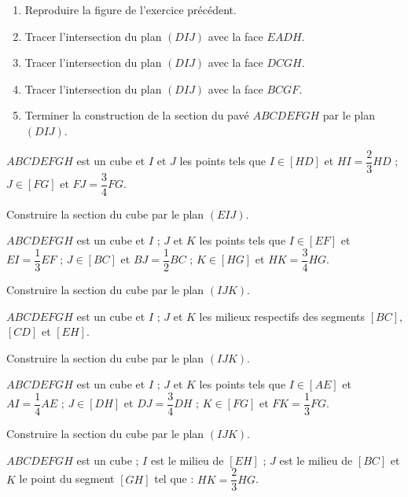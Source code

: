 \begin{colonne*exercice}
\begin{exercice}
  \begin{enumerate}
  \item Reproduire la figure de l'exercice précédent.
  \item Tracer l'intersection du plan $(DIJ)$ avec la face $EADH$.
  \item Tracer l'intersection du plan $(DIJ)$ avec la face $DCGH$.
  \item Tracer l'intersection du plan $(DIJ)$ avec la face $BCGF$.
  \item Terminer la construction de la section du pavé $ABCDEFGH$ par
    le plan $(DIJ)$.
  \end{enumerate}
\end{exercice}

\begin{exercice}
  $ABCDEFGH$ est un cube et $I$ et $J$ les points tels que $I\in [HD]$
  et $HI=\dfrac{2}{3}HD$ ; $J\in [FG]$ et $FJ=\dfrac{3}{4}FG$.

  Construire la section du cube par le plan $(EIJ)$.
\end{exercice}

\begin{exercice}
  $ABCDEFGH$ est un cube et $I$ ; $J$ et $K$ les points tels que
  $I\in [EF]$ et $EI=\dfrac{1}{3}EF$ ; $J\in [BC]$ et
  $BJ=\dfrac{1}{2}BC$ ; $K\in [HG]$ et $HK=\dfrac{3}{4}HG$.

  Construire la section du cube par le plan $(IJK)$.
\end{exercice}

\begin{exercice}
  $ABCDEFGH$ est un cube et $I$ ; $J$ et $K$ les milieux respectifs
  des segments $[BC]$, $[CD]$ et $[EH]$.

  Construire la section du cube par le plan $(IJK)$.
\end{exercice}

\begin{exercice}
  $ABCDEFGH$ est un cube et $I$ ; $J$ et $K$ les points tels que
  $I\in [AE]$ et $AI=\dfrac{1}{4}AE$ ; $J\in [DH]$ et
  $DJ=\dfrac{3}{4}DH$ ; $K\in [FG]$ et $FK=\dfrac{1}{3}FG$.

  Construire la section du cube par le plan $(IJK)$.
\end{exercice}



\begin{exercice}
  $ABCDEFGH$ est un cube ; $I$ est le milieu de $[EH]$ ; $J$ est le
  milieu de $[BC]$ et $K$ le point du segment $[GH]$ tel que :
  $HK=\dfrac{2}{3}HG$.


\end{exercice}
\end{colonne*exercice}
